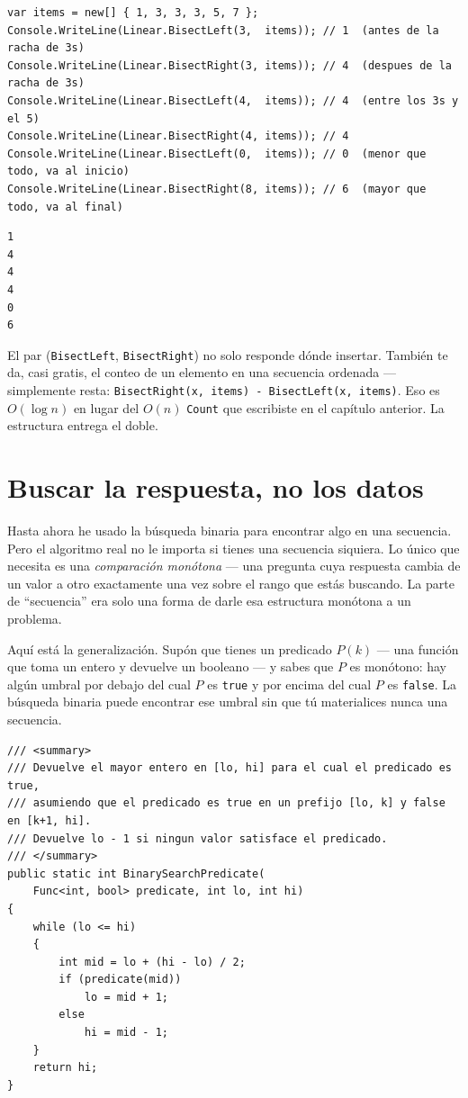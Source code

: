 \documentclass[11pt,a4paper]{article}
\begin{document}
\begin{lstlisting}
var items = new[] { 1, 3, 3, 3, 5, 7 };
Console.WriteLine(Linear.BisectLeft(3,  items)); // 1  (antes de la racha de 3s)
Console.WriteLine(Linear.BisectRight(3, items)); // 4  (despues de la racha de 3s)
Console.WriteLine(Linear.BisectLeft(4,  items)); // 4  (entre los 3s y el 5)
Console.WriteLine(Linear.BisectRight(4, items)); // 4
Console.WriteLine(Linear.BisectLeft(0,  items)); // 0  (menor que todo, va al inicio)
Console.WriteLine(Linear.BisectRight(8, items)); // 6  (mayor que todo, va al final)
\end{lstlisting}

\begin{verbatim}
1
4
4
4
0
6
\end{verbatim}

El par (\texttt{BisectLeft}, \texttt{BisectRight}) no solo responde dónde insertar. También te da, casi gratis, el conteo de un elemento en una secuencia ordenada --- simplemente resta: \texttt{BisectRight(x, items) - BisectLeft(x, items)}. Eso es $O(\log n)$ en lugar del $O(n)$ \texttt{Count} que escribiste en el capítulo anterior. La estructura entrega el doble.

\section{Buscar la respuesta, no los datos}

Hasta ahora he usado la búsqueda binaria para encontrar algo en una secuencia. Pero el algoritmo real no le importa si tienes una secuencia siquiera. Lo único que necesita es una \emph{comparación monótona} --- una pregunta cuya respuesta cambia de un valor a otro exactamente una vez sobre el rango que estás buscando. La parte de ``secuencia'' era solo una forma de darle esa estructura monótona a un problema.

Aquí está la generalización. Supón que tienes un predicado $P(k)$ --- una función que toma un entero y devuelve un booleano --- y sabes que $P$ es monótono: hay algún umbral por debajo del cual $P$ es \texttt{true} y por encima del cual $P$ es \texttt{false}. La búsqueda binaria puede encontrar ese umbral sin que tú materialices nunca una secuencia.

\begin{lstlisting}[caption={Búsqueda binaria sobre el predicado (\emph{binary search on the answer})}]
/// <summary>
/// Devuelve el mayor entero en [lo, hi] para el cual el predicado es true,
/// asumiendo que el predicado es true en un prefijo [lo, k] y false en [k+1, hi].
/// Devuelve lo - 1 si ningun valor satisface el predicado.
/// </summary>
public static int BinarySearchPredicate(
    Func<int, bool> predicate, int lo, int hi)
{
    while (lo <= hi)
    {
        int mid = lo + (hi - lo) / 2;
        if (predicate(mid))
            lo = mid + 1;
        else
            hi = mid - 1;
    }
    return hi;
}
\end{lstlisting}
\end{document}
